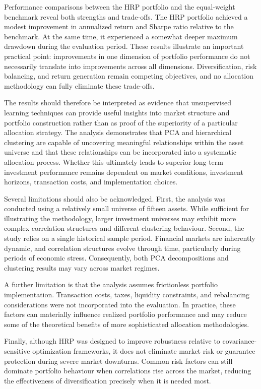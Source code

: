 \documentclass[
  12pt,
  letterpaper,
]{book}
\begin{document}
Performance comparisons between the HRP portfolio and the equal-weight
benchmark reveal both strengths and trade-offs. The HRP portfolio
achieved a modest improvement in annualized return and Sharpe ratio
relative to the benchmark. At the same time, it experienced a somewhat
deeper maximum drawdown during the evaluation period. These results
illustrate an important practical point: improvements in one dimension
of portfolio performance do not necessarily translate into improvements
across all dimensions. Diversification, risk balancing, and return
generation remain competing objectives, and no allocation methodology
can fully eliminate these trade-offs.

The results should therefore be interpreted as evidence that
unsupervised learning techniques can provide useful insights into market
structure and portfolio construction rather than as proof of the
superiority of a particular allocation strategy. The analysis
demonstrates that PCA and hierarchical clustering are capable of
uncovering meaningful relationships within the asset universe and that
these relationships can be incorporated into a systematic allocation
process. Whether this ultimately leads to superior long-term investment
performance remains dependent on market conditions, investment horizons,
transaction costs, and implementation choices.

Several limitations should also be acknowledged. First, the analysis was
conducted using a relatively small universe of fifteen assets. While
sufficient for illustrating the methodology, larger investment universes
may exhibit more complex correlation structures and different clustering
behaviour. Second, the study relies on a single historical sample
period. Financial markets are inherently dynamic, and correlation
structures evolve through time, particularly during periods of economic
stress. Consequently, both PCA decompositions and clustering results may
vary across market regimes.

A further limitation is that the analysis assumes frictionless portfolio
implementation. Transaction costs, taxes, liquidity constraints, and
rebalancing considerations were not incorporated into the evaluation. In
practice, these factors can materially influence realized portfolio
performance and may reduce some of the theoretical benefits of more
sophisticated allocation methodologies.

Finally, although HRP was designed to improve robustness relative to
covariance-sensitive optimization frameworks, it does not eliminate
market risk or guarantee protection during severe market downturns.
Common risk factors can still dominate portfolio behaviour when
correlations rise across the market, reducing the effectiveness of
diversification precisely when it is needed most.
\end{document}
